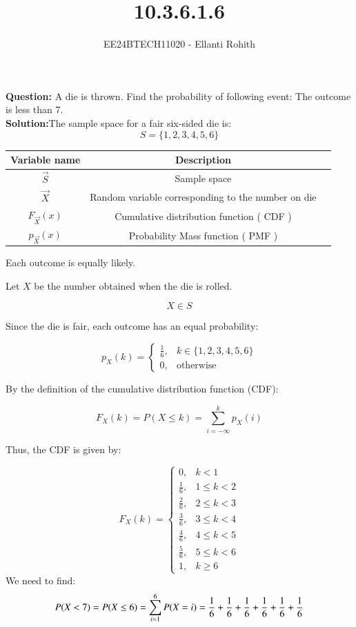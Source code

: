 \documentclass[journal]{IEEEtran}
\begin{document}

\vspace{3cm}



\title{10.3.6.1.6}
\author{EE24BTECH11020 - Ellanti Rohith}
{\let\newpage\relax\maketitle}
\textbf{Question:} A die is thrown. Find the probability of following event: The outcome is less than 7.
\\
\textbf{Solution:}The sample space for a fair six-sided die is:
\[
S = \{1,2,3,4,5,6\}
\]
\begin{center}
\begin{tabular}{|c|c|c|}
\hline 
\textbf{Variable name} & \textbf{Description} \\
\hline 
$\vec{S}$ & Sample space \\
\hline 
$\vec{X}$ & Random variable corresponding to the number on die \\
\hline

$F_{\vec{X}} (x)$ & Cumulative distribution function ( CDF ) \\
\hline
$p_{\vec{X}} (x)$ & Probability Mass function ( PMF ) \\
\hline
\end{tabular}
\end{center}
Each outcome is equally likely.

Let \( X \) be the number obtained when the die is rolled.

\[
X \in S
\]


Since the die is fair, each outcome has an equal probability:

\[
p_X(k) =
\begin{cases}
\frac{1}{6}, & k \in \{1,2,3,4,5,6\} \\
0, & \text{otherwise}
\end{cases}
\]

By the definition of the cumulative distribution function (CDF):

\[
F_X(k) = P(X \leq k) = \sum_{i=-\infty}^{k} p_X(i)
\]

Thus, the CDF is given by:

\[
F_X(k) =
\begin{cases}
0, & k < 1 \\
\frac{1}{6}, & 1 \leq k < 2 \\
\frac{2}{6}, & 2 \leq k < 3 \\
\frac{3}{6}, & 3 \leq k < 4 \\
\frac{4}{6}, & 4 \leq k < 5 \\
\frac{5}{6}, & 5 \leq k < 6 \\
1, & k \geq 6
\end{cases}
\]
We need to find:
\[
P(X < 7) = P(X \leq 6) = \sum_{i=1}^{6} P(X = i)\\
= \frac{1}{6} + \frac{1}{6} + \frac{1}{6} + \frac{1}{6} + \frac{1}{6} + \frac{1}{6}
\]
\end{document}
